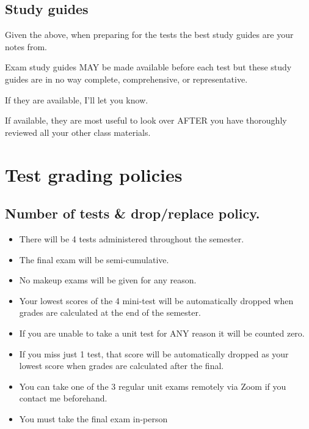 \documentclass[
]{book}
\providecommand{\tightlist}{%
  \setlength{\itemsep}{0pt}\setlength{\parskip}{0pt}}
\begin{document}
\hypertarget{study-guides}{%
\section{Study guides}\label{study-guides}}

Given the above, when preparing for the tests the best study guides are your notes from.

Exam study guides MAY be made available before each test but these study guides are in no way complete, comprehensive, or representative.

If they are available, I'll let you know.

If available, they are most useful to look over AFTER you have thoroughly reviewed all your other class materials.

\hypertarget{test-grading-policies}{%
\chapter{Test grading policies}\label{test-grading-policies}}

\hypertarget{number-of-tests-dropreplace-policy.}{%
\section{Number of tests \& drop/replace policy.}\label{number-of-tests-dropreplace-policy.}}

\begin{itemize}
\tightlist
\item
  There will be 4 tests administered throughout the semester.
\item
  The final exam will be semi-cumulative.
\item
  No makeup exams will be given for any reason.
\item
  Your lowest scores of the 4 mini-test will be automatically dropped when grades are calculated at the end of the semester.\\
\item
  If you are unable to take a unit test for ANY reason it will be counted zero.
\item
  If you miss just 1 test, that score will be automatically dropped as your lowest score when grades are calculated after the final.
\item
  You can take one of the 3 regular unit exams remotely via Zoom if you contact me beforehand.
\item
  You must take the final exam in-person
\end{itemize}
\end{document}
